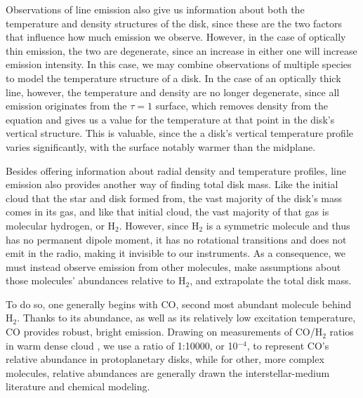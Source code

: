 Observations of line emission also give us information about both the temperature and density structures of the disk, since these are the two factors that influence how much emission we observe. However, in the case of optically thin emission, the two are degenerate, since an increase in either one will increase emission intensity. In this case, we may combine observations of multiple species to model the temperature structure of a disk. In the case of an optically thick line, however, the temperature and density are no longer degenerate, since all emission originates from the $\tau=1$ surface, which removes density from the equation and gives us a value for the temperature at that point in the disk's vertical structure. This is valuable, since the a disk's vertical temperature profile varies significantly, with the surface notably warmer than the midplane.

Besides offering information about radial density and temperature profiles, line emission also provides another way of finding total disk mass. Like the initial cloud that the star and disk formed from, the vast majority of the disk's mass comes in its gas, and like that initial cloud, the vast majority of that gas is molecular hydrogen, or H$_2$. However, since H$_2$ is a symmetric molecule and thus has no permanent dipole moment, it has no rotational transitions and does not emit in the radio, making it invisible to our instruments. As a consequence, we must instead observe emission from other molecules, make assumptions about those molecules' abundances relative to H$_2$, and extrapolate the total disk mass.


To do so, one generally begins with CO, second most abundant molecule behind H$_2$. Thanks to its abundance, as well as its relatively low excitation temperature, CO provides robust, bright emission. Drawing on measurements of CO/H$_2$ ratios in warm dense cloud \citep{AikawaHerbst2003,Fogel2011}, we use a ratio of 1:10000, or 10$^{-4}$, to represent CO's relative abundance in protoplanetary disks, while for other, more complex molecules, relative abundances are generally drawn the interstellar-medium literature and chemical modeling.

